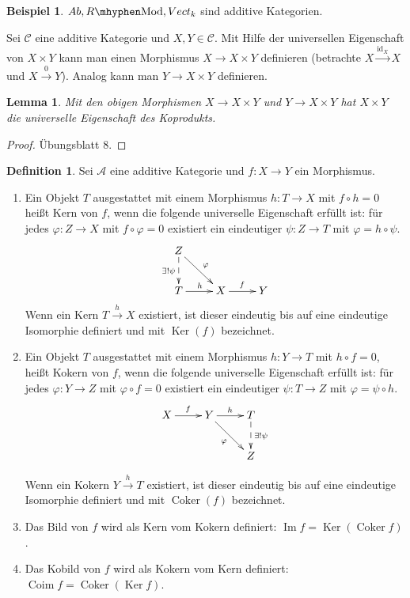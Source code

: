 \documentclass[reqno,12pt]{article}
\numberwithin{equation}{section}
\newcommand{\cA}{\mathcal{A}}
\newcommand{\cC}{\mathcal{C}}
\newcommand{\id}{\text{id}}
\newcommand{\Ker}{\text{Ker }}
\renewcommand{\Im}{\text{Im }}
\theoremstyle{plain}
\newtheorem{lemma}[thm]{Lemma}
\theoremstyle{definition}
\newtheorem{definition}[thm]{Definition}
\newtheorem{example}[thm]{Beispiel}
\renewcommand{\Ker}{\operatorname{Ker}}
\renewcommand{\Im}{\operatorname{Im}}
\newcommand{\Coker}{\operatorname{Coker}}
\newcommand{\Coim}{\operatorname{Coim}}
\newcommand{\Mod}{\text{Mod}}
\begin{document}
\begin{example}
$Ab, R \mhyphen \Mod, Vect_k$ sind additive Kategorien.
\end{example}

\medskip

\noindent Sei $\cC$ eine additive Kategorie und $X, Y \in \cC$. Mit Hilfe der universellen Eigenschaft von $X \times Y$ kann man einen Morphismus $X \to X \times Y$ definieren (betrachte $X \overset{\id_X}{\to} X$ und $X \overset{0}{\to} Y$). Analog kann man $Y \to X \times Y$ definieren.


\begin{lemma}
Mit den obigen Morphismen $X \to X \times Y$ und $Y \to X \times Y$ hat $X \times Y$ die universelle Eigenschaft des Koprodukts.
\end{lemma}

\begin{proof}
Übungsblatt 8.
\end{proof}



\begin{definition}
Sei $\cA$ eine additive Kategorie und $f \colon X \to Y$ ein Morphismus.
\begin{enumerate}
  \item Ein Objekt $T$ ausgestattet mit einem Morphismus $h \colon T \to X$ mit $f\circ h = 0$ heißt {\sf Kern} von $f$, wenn die folgende universelle Eigenschaft erfüllt ist: für jedes $\varphi \colon  Z \to X$ mit $f\circ \varphi = 0$ existiert ein eindeutiger $\psi \colon Z \to T$ mit $\varphi = h \circ \psi$.
  \begin{align*}
  \xymatrix{
  Z \ar[dr]^{\varphi} \ar@{-->}[d]_{\exists ! \psi} \\
  T \ar[r]^h & X \ar[r]^f & Y
  }
  \end{align*}
  Wenn ein Kern $T \overset{h}{\to} X$ existiert, ist dieser eindeutig bis auf eine eindeutige Isomorphie definiert und mit $\Ker(f)$ bezeichnet.


  \item  Ein Objekt $T$ ausgestattet mit einem Morphismus $h \colon Y \to T$ mit $h \circ f = 0$, heißt {\sf Kokern} von $f$, wenn die folgende universelle Eigenschaft erfüllt ist: für jedes $\varphi \colon  Y \to Z$ mit $\varphi \circ f= 0$ existiert ein eindeutiger $\psi \colon T \to Z$ mit $\varphi = \psi \circ h$.
  \begin{align*}
  \xymatrix{
  X \ar[r]^f & Y \ar[r]^h \ar[dr]_{\varphi} & T \ar@{-->}[d]^{\exists ! \psi} \\
   &&Z
  }
  \end{align*}

  Wenn ein Kokern $Y \overset{h}{\to} T$ existiert, ist dieser eindeutig bis auf eine eindeutige Isomorphie definiert und mit $\Coker(f)$ bezeichnet.


  \item Das {\sf Bild} von $f$ wird als Kern vom Kokern definiert: $\Im f = \Ker(\Coker f)$.

  \item Das {\sf Kobild} von $f$ wird als Kokern vom Kern definiert: $\Coim f = \Coker(\Ker f)$.
  \end{enumerate}
\end{definition}
\end{document}
